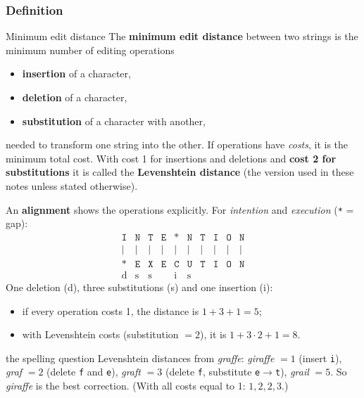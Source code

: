 \subsubsection{Definition}

\begin{nbdef}{Minimum edit distance}
The \textbf{minimum edit distance} between two strings is the minimum number of
editing operations
\begin{itemize}[nosep]
  \item \textbf{insertion} of a character,
  \item \textbf{deletion} of a character,
  \item \textbf{substitution} of a character with another,
\end{itemize}
needed to transform one string into the other. If operations have \emph{costs}, it is the
minimum total cost. With cost 1 for insertions and deletions and \textbf{cost 2 for
substitutions} it is called the \textbf{Levenshtein distance} (the version used in these
notes unless stated otherwise).
\end{nbdef}

An \textbf{alignment} shows the operations explicitly. For \emph{intention} and
\emph{execution} (\texttt{*} = gap):
\[
\begin{array}{*{10}{c}}
  \texttt{I} & \texttt{N} & \texttt{T} & \texttt{E} & \texttt{*} & \texttt{N} & \texttt{T} & \texttt{I} & \texttt{O} & \texttt{N}\\
  | & | & | & | & | & | & | & | & | & |\\
  \texttt{*} & \texttt{E} & \texttt{X} & \texttt{E} & \texttt{C} & \texttt{U} & \texttt{T} & \texttt{I} & \texttt{O} & \texttt{N}\\
  \text{d} & \text{s} & \text{s} & & \text{i} & \text{s} & & & &
\end{array}
\]
One deletion (d), three substitutions (s) and one insertion (i):
\begin{itemize}[nosep]
  \item if every operation costs 1, the distance is $1 + 3 + 1 = 5$;
  \item with Levenshtein costs (substitution $= 2$), it is $1 + 3\cdot 2 + 1 = 8$.
\end{itemize}

\begin{nbexample}{the spelling question}
Levenshtein distances from \emph{graffe}: \emph{giraffe} $=1$ (insert \texttt{i}),
\emph{graf} $=2$ (delete \texttt{f} and \texttt{e}), \emph{graft} $=3$ (delete
\texttt{f}, substitute \texttt{e}$\to$\texttt{t}), \emph{grail} $=5$. So \emph{giraffe}
is the best correction. (With all costs equal to 1: $1, 2, 2, 3$.)
\end{nbexample}

